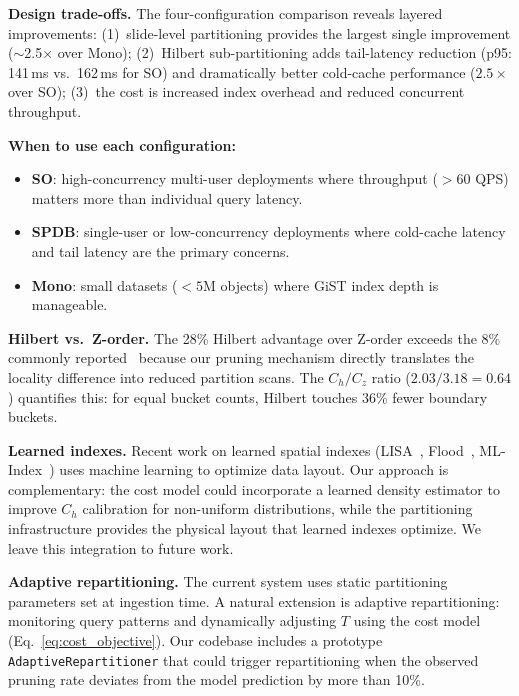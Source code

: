 \documentclass[sigconf]{acmart}
\begin{document}
\textbf{Design trade-offs.}
The four-configuration comparison reveals layered improvements:
(1)~slide-level partitioning provides the largest single improvement ($\sim$2.5$\times$ over Mono);
(2)~Hilbert sub-partitioning adds tail-latency reduction (p95: 141\,ms vs.\ 162\,ms for SO) and dramatically better cold-cache performance ($2.5\times$ over SO);
(3)~the cost is increased index overhead and reduced concurrent throughput.

\textbf{When to use each configuration:}
\begin{itemize}
\item \textbf{SO}: high-concurrency multi-user deployments where throughput ($>$60 QPS) matters more than individual query latency.
\item \textbf{SPDB}: single-user or low-concurrency deployments where cold-cache latency and tail latency are the primary concerns.
\item \textbf{Mono}: small datasets ($< 5$M objects) where GiST index depth is manageable.
\end{itemize}

\textbf{Hilbert vs.\ Z-order.}
The 28\% Hilbert advantage over Z-order exceeds the 8\% commonly reported~\cite{kamel1994hilbert} because our pruning mechanism directly translates the locality difference into reduced partition scans.
The $C_h/C_z$ ratio ($2.03/3.18 = 0.64$) quantifies this: for equal bucket counts, Hilbert touches 36\% fewer boundary buckets.

\textbf{Learned indexes.}
Recent work on learned spatial indexes (LISA~\cite{li2020lisa}, Flood~\cite{nathan2020flood}, ML-Index~\cite{kraska2018case}) uses machine learning to optimize data layout.
Our approach is complementary: the cost model could incorporate a learned density estimator to improve $C_h$ calibration for non-uniform distributions, while the partitioning infrastructure provides the physical layout that learned indexes optimize.
We leave this integration to future work.

\textbf{Adaptive repartitioning.}
The current system uses static partitioning parameters set at ingestion time.
A natural extension is adaptive repartitioning: monitoring query patterns and dynamically adjusting $T$ using the cost model (Eq.~\ref{eq:cost_objective}).
Our codebase includes a prototype \texttt{AdaptiveRepartitioner} that could trigger repartitioning when the observed pruning rate deviates from the model prediction by more than 10\%.
\end{document}
